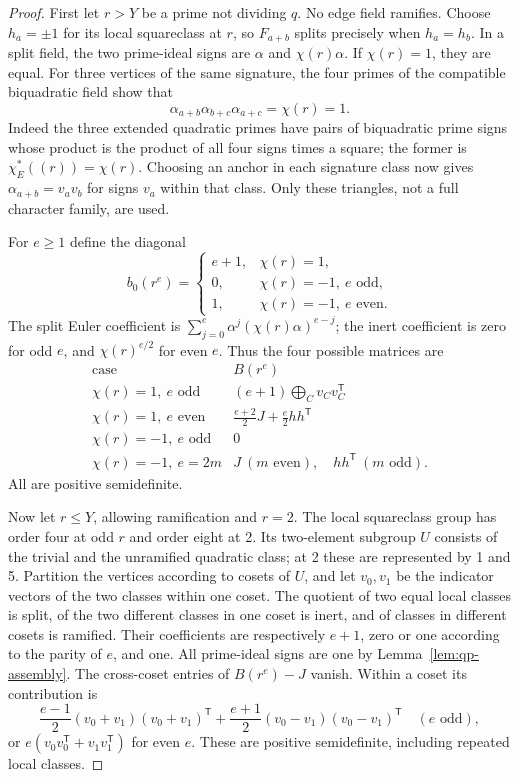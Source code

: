 \begin{proof}
First let $r>Y$ be a prime not dividing $q$.  No edge field ramifies.
Choose $h_a=\pm1$ for its local squareclass at $r$, so $F_{a+b}$
splits precisely when $h_a=h_b$.  In a split field, the two prime-ideal
signs are $\alpha$ and $\chi(r)\alpha$.  If $\chi(r)=1$, they are
equal.  For three vertices of the same signature, the four primes of
the compatible biquadratic field show that
\[
 \alpha_{a+b}\alpha_{b+c}\alpha_{a+c}=\chi(r)=1.
\]
Indeed the three extended quadratic primes have pairs of biquadratic
prime signs whose product is the product of all four signs times a
square; the former is $\chi_E^*((r))=\chi(r)$.
Choosing an anchor in each signature class now gives
$\alpha_{a+b}=v_av_b$ for signs $v_a$ within that class.  Only these
triangles, not a full character family, are used.

For $e\geq1$ define the diagonal
\[
 b_0(r^e)=
 \begin{cases}
 e+1,&\chi(r)=1,\\
 0,&\chi(r)=-1,\ e\text{ odd},\\
 1,&\chi(r)=-1,\ e\text{ even}.
 \end{cases}
\]
The split Euler coefficient is
$\sum_{j=0}^e\alpha^j(\chi(r)\alpha)^{e-j}$; the inert coefficient
is zero for odd $e$, and $\chi(r)^{e/2}$ for even $e$.
Thus the four possible matrices are
\[
\begin{array}{c|c}
\text{case}&B(r^e)\\\hline
\chi(r)=1,\ e\text{ odd}&
 (e+1)\bigoplus_Cv_Cv_C^{\mathsf T}\\
\chi(r)=1,\ e\text{ even}&
 \frac{e+2}{2}J+\frac e2hh^{\mathsf T}\\
\chi(r)=-1,\ e\text{ odd}&0\\
\chi(r)=-1,\ e=2m&J\ (m\text{ even}),\quad hh^{\mathsf T}\ (m\text{ odd}).
\end{array}
\]
All are positive semidefinite.

Now let $r\leq Y$, allowing ramification and $r=2$.
The local squareclass group has order four at odd $r$ and order eight
at 2.  Its two-element subgroup $U$ consists of the trivial and the
unramified quadratic class; at 2 these are represented by 1 and 5.
Partition the vertices according to cosets of $U$, and let $v_0,v_1$
be the indicator vectors of the two classes within one coset.
The quotient of two equal local classes is split, of the two different
classes in one coset is inert, and of classes in different cosets is
ramified.  Their coefficients are respectively $e+1$, zero or one
according to the parity of $e$, and one.  All prime-ideal signs are one
by Lemma~\ref{lem:qp-assembly}.  The cross-coset entries of
$B(r^e)-J$ vanish.  Within a coset its contribution is
\[
 \frac{e-1}{2}(v_0+v_1)(v_0+v_1)^{\mathsf T}
 +\frac{e+1}{2}(v_0-v_1)(v_0-v_1)^{\mathsf T}
 \quad(e\text{ odd}),
\]
or $e(v_0v_0^{\mathsf T}+v_1v_1^{\mathsf T})$ for even $e$.
These are positive semidefinite, including repeated local classes.


\end{proof}
